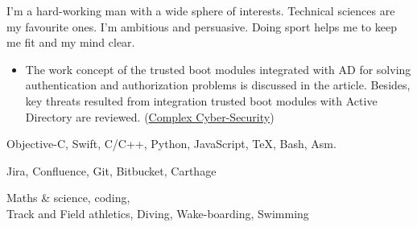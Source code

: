 I’m a hard-working man with a wide sphere of interests. Technical sciences are my favourite ones. I’m ambitious and persuasive. Doing sport helps me to keep me fit and my mind clear.




\begin{itemize}
\item {}
The work concept of the trusted boot modules integrated with AD for solving authentication and authorization problems is discussed in the article. Besides, key threats resulted from integration trusted boot modules with Active Directory are reviewed.
(\href{http://www.okbsapr.ru/shkola_kzi_pokhachevsky_2019.html}{Complex Cyber-Security})
\end{itemize}







Objective-C, Swift, C/C++, Python, JavaScript, TeX, Bash, Asm.

Jira, Confluence, Git, Bitbucket, Carthage

Maths \& science, coding, 
\\Track and Field athletics, Diving, Wake-boarding, Swimming